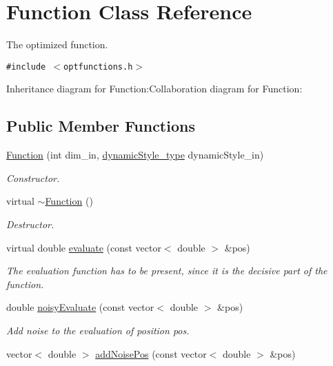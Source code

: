 \hypertarget{classFunction}{
\section{Function Class Reference}
\label{classFunction}
}
The optimized function.  


{\tt \#include $<$optfunctions.h$>$}

Inheritance diagram for Function:Collaboration diagram for Function:\subsection*{Public Member Functions}
\begin{CompactItemize}
\item 
\hyperlink{classFunction_bd175da63d6074598263a19bec3b1241}{Function} (int dim\_\-in, \hyperlink{optfunctions_8h_ae9aa3a5dd199a43e77abc2cccf4477e}{dynamicStyle\_\-type} dynamicStyle\_\-in)
\begin{CompactList}\small\item\em Constructor. \item\end{CompactList}\item 
virtual \hyperlink{classFunction_3b03f7cf0b75d16edebdda1dee1db6fd}{$\sim$Function} ()
\begin{CompactList}\small\item\em Destructor. \item\end{CompactList}\item 
virtual double \hyperlink{classFunction_159260a1fc3afa8932491e4057b6b844}{evaluate} (const vector$<$ double $>$ \&pos)
\begin{CompactList}\small\item\em The evaluation function has to be present, since it is the decisive part of the function. \item\end{CompactList}\item 
double \hyperlink{classFunction_ee755167a250e9bfea3148396a7865d2}{noisyEvaluate} (const vector$<$ double $>$ \&pos)
\begin{CompactList}\small\item\em Add noise to the evaluation of position pos. \item\end{CompactList}\item 
vector$<$ double $>$ \hyperlink{classFunction_af172a6b18b99aeeccdc22d408a5fc29}{addNoisePos} (const vector$<$ double $>$ \&pos)

\end{CompactItemize}
